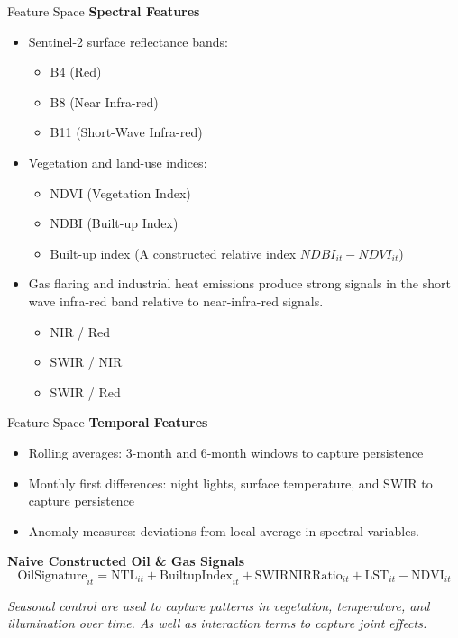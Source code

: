 \documentclass[10pt]{beamer}
\begin{document}
\begin{frame}{Feature Space}
\textbf{Spectral Features}
\begin{itemize}
    \item Sentinel-2 surface reflectance bands:
    \begin{itemize}
        \item B4 (Red)
        \item B8 (Near Infra-red)
        \item B11 (Short-Wave Infra-red)
    \end{itemize}
    \item Vegetation and land-use indices:
    \begin{itemize}
        \item NDVI (Vegetation Index)
        \item NDBI (Built-up Index)
        \item Built-up index (A constructed relative index $NDBI_{it} - NDVI_{it}$)
    \end{itemize}
    \item Gas flaring and industrial heat emissions produce strong signals in the
short wave infra-red band relative to near-infra-red signals. 
    \begin{itemize}
        \item NIR / Red
        \item SWIR / NIR %
        \item SWIR / Red
    \end{itemize}
\end{itemize}


\end{frame}

\begin{frame}{Feature Space}
\textbf{Temporal Features}
\begin{itemize}
    \item Rolling averages: 3-month and 6-month windows to capture persistence
    \item Monthly first differences: night lights, surface temperature, and SWIR to capture persistence
    \item Anomaly measures: deviations from local average in spectral variables.
\end{itemize}

\textbf{Naive Constructed Oil \& Gas Signals}
\[
\text{OilSignature}_{it}
=
\text{NTL}_{it}
+
\text{BuiltupIndex}_{it}
+
\text{SWIRNIRRatio}_{it}
+
\text{LST}_{it}
-
\text{NDVI}_{it}
\]
\vspace{0.2cm} 

\textit{Seasonal control are used to capture patterns in vegetation, temperature, and illumination over time. As well as interaction terms to capture joint effects.}
\end{frame}
\end{document}
